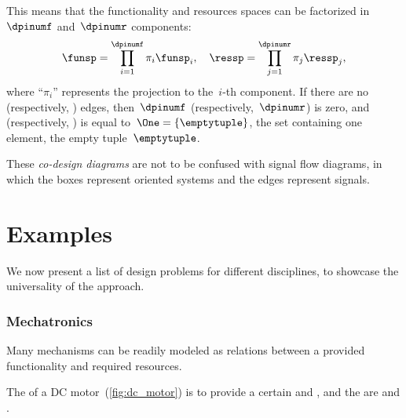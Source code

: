 \begin{figure}[h]
	\centering
	\caption{\label{fig:dp_graphical}}
\end{figure}


This means that the functionality and resources spaces can be factorized in~$\dpinumf$ and~$\dpinumr$ components:
\begin{equation*}
	\funsp=\prod_{i=1}^{\dpinumf}\pi_{i}\funsp_{i},\quad \ressp=\prod_{j=1}^{\dpinumr}\pi_{j}\ressp_{j},
\end{equation*}
where ``$\pi_{i}$'' represents the projection to the~$i$-th component.
If there are no  (respectively, ) edges, then~$\dpinumf$ (respectively,~$\dpinumr$) is zero, and \funsp (respectively, \ressp) is equal to~$\One=\{\emptytuple \}$, the set containing one element, the empty tuple~$\emptytuple$.

These \emph{co-design diagrams} are not to be confused with signal flow diagrams, in which the boxes represent oriented systems and the edges represent signals.


\section{Examples}
We now present a list of design problems for different disciplines, to showcase the universality of the approach.

\subsubsection{Mechatronics}
Many mechanisms can be readily modeled as relations between a provided functionality and required resources.

\begin{example}
	The  of a DC motor~(\cref{fig:dc_motor}) is to provide a certain  and , and the  are  and .
\end{example}


